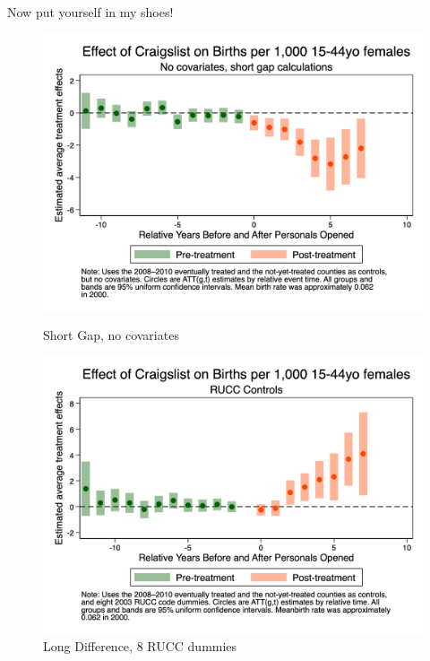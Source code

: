 \documentclass{beamer}
\begin{document}
\begin{frame}{Now put yourself in my shoes!}

\begin{figure}[htbp]
    \centering
    \begin{minipage}[b]{0.48\textwidth}
        \centering
    \includegraphics[height=0.45\textheight]{./lecture_includes/es_births_shortnone}
        \caption{Short Gap, no covariates}
    \end{minipage}
    \hfill
    \begin{minipage}[b]{0.48\textwidth}
        \centering
    \includegraphics[height=0.45\textheight]{./lecture_includes/es_births_RUCC.png}
        \caption{Long Difference, 8 RUCC dummies}
    \end{minipage}
\end{figure}

\end{frame}
\end{document}
